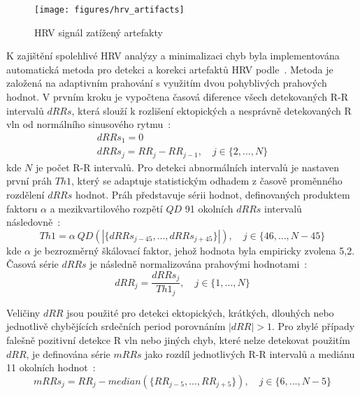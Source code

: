\begin{figure}[h]
    \begin{center}
        \texttt{[image: figures/hrv\_artifacts]}
        \caption{HRV signál zatížený artefakty}
        \label{fig:hrv_artifacts}
    \end{center}
\end{figure}

K zajištění spolehlivé HRV analýzy a minimalizaci chyb byla implementována
automatická metoda pro detekci a korekci artefaktů HRV
podle~\cite{Lipponen2019}. Metoda je založená na adaptivním prahování s využitím
dvou pohyblivých prahových hodnot. V prvním kroku je vypočtena časová diference
všech detekovaných R-R intervalů $dRRs$, která slouží k rozlišení ektopických a
nesprávně detekovaných R vln od normálního sinusového rytmu~\cite{Lipponen2019}:
\begin{gather}
    dRRs_1 = 0 \nonumber \\
    dRRs_j = RR_j - RR_{j-1}, \quad j \in \{2,...,N\}
\end{gather}
kde $N$ je počet R-R intervalů. Pro detekci abnormálních intervalů je nastaven
první práh $Th1$, který se adaptuje statistickým odhadem z časově proměnného
rozdělení $dRRs$ hodnot. Práh představuje sérii hodnot, definovaných produktem
faktoru $\alpha$ a mezikvartilového rozpětí $QD$ 91 okolních $dRRs$ intervalů
následovně~\cite{Lipponen2019}:
\begin{equation}
    Th1 = \alpha~QD(|\{dRRs_{j-45},...,dRRs_{j+45}\}|), \quad j \in \{46,...,N-45\}
\end{equation}
kde $\alpha$ je bezrozměrný škálovací faktor, jehož hodnota byla empiricky zvolena
5,2. Časová série $dRRs$ je následně normalizována prahovými
hodnotami~\cite{Lipponen2019}:
\begin{equation}
    dRR_j = \frac{dRRs_j}{Th1_j}, \quad j \in \{1,...,N\}
\end{equation}

Veličiny $dRR$ jsou použité pro detekci ektopických, krátkých, dlouhých nebo
jednotlivě chybějících srdečních period porovnáním $|dRR|>1$. Pro zbylé případy
falešně pozitivní detekce R vln nebo jiných chyb, které nelze detekovat použitím
$dRR$, je definována série $mRRs$ jako rozdíl jednotlivých R-R intervalů a
mediánu 11 okolních hodnot~\cite{Lipponen2019}:
\begin{equation}
    mRRs_j = RR_j - median(\{RR_{j-5},...,RR_{j+5}\}), \quad j \in \{6,...,N-5\}
\end{equation}

